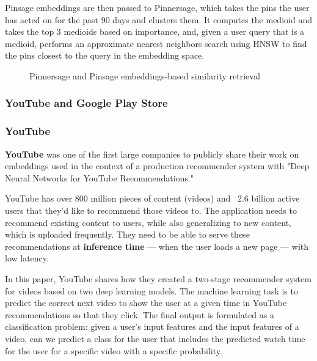 \documentclass[11pt, table]{diazessay} %
\begin{document}
\begin{sloppypar}
Pinsage embeddings are then passed to Pinnersage, which takes the pins the user has acted on for the past 90 days and clusters them. It computes the medioid and takes the top 3 medioids based on importance, and, given a user query that is a medioid, performs an approximate nearest neighbors search using HNSW to find the pins closest to the query in the embedding space. 

\begin{figure}[H]
\caption{Pinnersage and Pinsage embeddings-based similarity retrieval}
\end{figure}

\subsubsection{YouTube and Google Play Store}

\subsubsection*{YouTube}
\textbf{YouTube }was one of the first large companies to publicly share their work on embeddings used in the context of a production recommender system with "Deep Neural Networks for YouTube Recommendations." 

YouTube has over 800 million pieces of content (videos) and ~2.6 billion active users that they'd like to recommend those videos to. The application needs to recommend existing content to users, while also generalizing to new content, which is uploaded frequently. They need to be able to serve these recommendations at \textbf{inference time} --- when the user loads a new page --- with low latency.

In this paper\citep{covington2016deep}, YouTube shares how they created a two-stage recommender system for videos based on two deep learning models. The machine learning task is to predict the correct next video to show the user at a given time in YouTube recommendations so that they click.  The final output is formulated as a classification problem: given a user's input features and the input features of a video, can we predict a class for the user that includes the predicted watch time for the user for a specific video with a specific probability. 


\end{sloppypar}
\end{document}
